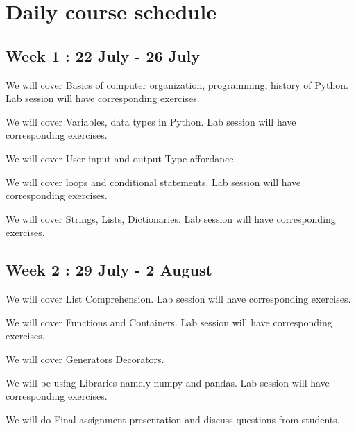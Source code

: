 \section{Daily course schedule}

\subsection{Week 1 : 22 July - 26 July}
We will cover Basics of computer organization, programming, history of Python.
Lab session will have corresponding exercises.

We will cover Variables, data types in Python.
Lab session will have corresponding exercises.

We will cover User input and output Type affordance.

We will cover loops and conditional statements.
Lab session will have corresponding exercises.

We will cover Strings, Lists, Dictionaries.
Lab session will have corresponding exercises.

\subsection{Week 2 : 29 July - 2 August}

We will cover List Comprehension.
Lab session will have corresponding exercises.

We will cover Functions and Containers.
Lab session will have corresponding exercises.

We will cover Generators Decorators.

We will be using Libraries  namely numpy and pandas.
Lab session will have corresponding exercises.

We will do Final assignment presentation and discuss questions from students.
